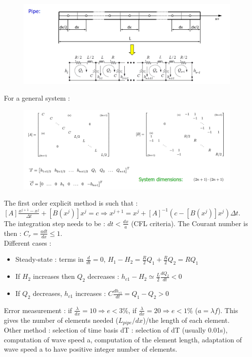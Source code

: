 \documentclass[../main.tex]{subfiles}
\begin{document}
\begin{figure}[hbt!]
    \centering
    \includegraphics[width=0.5\linewidth]{IMAGES/Hydraulic/Screenshot from 2025-03-28 11-38-27.png}
\end{figure}

For a general system : \begin{figure}[hbt!]
    \centering
    \includegraphics[width=0.5\linewidth]{IMAGES/Hydraulic/Screenshot from 2025-04-04 10-25-42.png}
\end{figure}

The first order explicit method is such that : $[A] \frac{x^{j+1} - x^j}{\Delta t} + [B(x^j)] x^j = c \Rightarrow x^{j+1} = x^j + [A]^{-1} (c-[B(x^j)] x^j)\Delta t$. \warning The integration step needs to be : $dt < \frac{dx}{a}$ (CFL criteria). The Courant number is then : $C_r = \frac{a dt}{dx}\leq 1$.\\

Different cases :
\begin{itemize}
    \item Steady-state : terms in $\frac{d}{dt} = 0$, $H_1-H_2 = \frac{R}{2}Q_1 + \frac{R}{2}Q_2 = RQ_1$
    \item If $H_2$ increases then $Q_2$ decreases : $h_{c1}-H_2\simeq \frac{L}{2} \frac{dQ_2}{dt}<0$
    \item If $Q_2$ decreases, $h_{c1}$ increases : $C\frac{dh_{c1}}{dt} = Q_1-Q_2>0$
\end{itemize}

Error measurement : if $\frac{\lambda}{dx} = 10 \Rightarrow e<3\%$, if $\frac{\lambda}{dx} = 20 \Rightarrow e<1\%$ ($a = \lambda f$). This gives the number of elements needed ($L_{pipe}/dx$)/the length of each element.\\

Other method : selection of time basis dT : selection of dT (usually 0.01s), computation of wave speed a, computation of the element length, adaptation of wave speed a to have positive integer number of elements. \\
\end{document}
